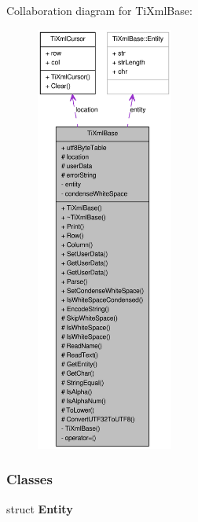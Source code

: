 Collaboration diagram for TiXmlBase:\nopagebreak
\begin{figure}[H]
\begin{center}
\leavevmode
\includegraphics[height=400pt]{class_ti_xml_base__coll__graph}
\end{center}
\end{figure}
\subsubsection*{Classes}
\begin{DoxyCompactItemize}
\item 
struct {\bfseries Entity}
\end{DoxyCompactItemize}
